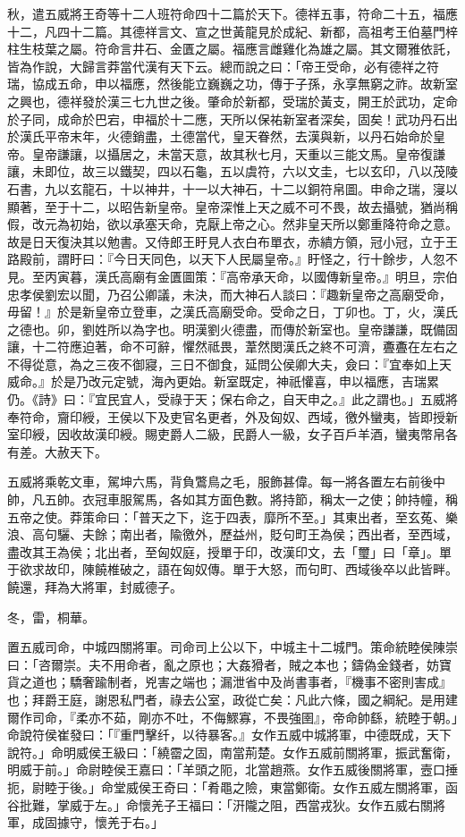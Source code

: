 \begin{pinyinscope}
秋，遣五威將王奇等十二人班符命四十二篇於天下。德祥五事，符命二十五，福應十二，凡四十二篇。其德祥言文、宣之世黃龍見於成紀、新都，高祖考王伯墓門梓柱生枝葉之屬。符命言井石、金匱之屬。福應言雌雞化為雄之屬。其文爾雅依託，皆為作說，大歸言莽當代漢有天下云。總而說之曰：「帝王受命，必有德祥之符瑞，協成五命，申以福應，然後能立巍巍之功，傳于子孫，永享無窮之祚。故新室之興也，德祥發於漢三七九世之後。肇命於新都，受瑞於黃支，開王於武功，定命於子同，成命於巴宕，申福於十二應，天所以保祐新室者深矣，固矣！武功丹石出於漢氏平帝末年，火德銷盡，土德當代，皇天眷然，去漢與新，以丹石始命於皇帝。皇帝謙讓，以攝居之，未當天意，故其秋七月，天重以三能文馬。皇帝復謙讓，未即位，故三以鐵契，四以石龜，五以虞符，六以文圭，七以玄印，八以茂陵石書，九以玄龍石，十以神井，十一以大神石，十二以銅符帛圖。申命之瑞，寖以顯著，至于十二，以昭告新皇帝。皇帝深惟上天之威不可不畏，故去攝號，猶尚稱假，改元為初始，欲以承塞天命，克厭上帝之心。然非皇天所以鄭重降符命之意。故是日天復決其以勉書。又侍郎王盱見人衣白布單衣，赤繢方領，冠小冠，立于王路殿前，謂盱曰：『今日天同色，以天下人民屬皇帝。』盱怪之，行十餘步，人忽不見。至丙寅暮，漢氏高廟有金匱圖策：『高帝承天命，以國傳新皇帝。』明旦，宗伯忠孝侯劉宏以聞，乃召公卿議，未決，而大神石人談曰：『趣新皇帝之高廟受命，毋留！』於是新皇帝立登車，之漢氏高廟受命。受命之日，丁卯也。丁，火，漢氏之德也。卯，劉姓所以為字也。明漢劉火德盡，而傳於新室也。皇帝謙謙，既備固讓，十二符應迫著，命不可辭，懼然祗畏，葦然閔漢氏之終不可濟，斖斖在左右之不得從意，為之三夜不御寢，三日不御食，延問公侯卿大夫，僉曰：『宜奉如上天威命。』於是乃改元定號，海內更始。新室既定，神祇懽喜，申以福應，吉瑞累仍。《詩》曰：『宜民宜人，受祿于天；保右命之，自天申之。』此之謂也。」五威將奉符命，齎印綬，王侯以下及吏官名更者，外及匈奴、西域，徼外蠻夷，皆即授新室印綬，因收故漢印綬。賜吏爵人二級，民爵人一級，女子百戶羊酒，蠻夷幣帛各有差。大赦天下。

五威將乘乾文車，駕坤六馬，背負鷩鳥之毛，服飾甚偉。每一將各置左右前後中帥，凡五帥。衣冠車服駕馬，各如其方面色數。將持節，稱太一之使；帥持幢，稱五帝之使。莽策命曰：「普天之下，迄于四表，靡所不至。」其東出者，至玄菟、樂浪、高句驪、夫餘；南出者，隃徼外，歷益州，貶句町王為侯；西出者，至西域，盡改其王為侯；北出者，至匈奴庭，授單于印，改漢印文，去「璽」曰「章」。單于欲求故印，陳饒椎破之，語在匈奴傳。單于大怒，而句町、西域後卒以此皆畔。饒還，拜為大將軍，封威德子。

冬，雷，桐華。

置五威司命，中城四關將軍。司命司上公以下，中城主十二城門。策命統睦侯陳崇曰：「咨爾崇。夫不用命者，亂之原也；大姦猾者，賊之本也；鑄偽金錢者，妨寶貨之道也；驕奢踰制者，兇害之端也；漏泄省中及尚書事者，『機事不密則害成』也；拜爵王庭，謝恩私門者，祿去公室，政從亡矣：凡此六條，國之綱紀。是用建爾作司命，『柔亦不茹，剛亦不吐，不侮鰥寡，不畏強圉』，帝命帥繇，統睦于朝。」命說符侯崔發曰：「『重門擊纤，以待暴客。』女作五威中城將軍，中德既成，天下說符。」命明威侯王級曰：「繞霤之固，南當荊楚。女作五威前關將軍，振武奮衛，明威于前。」命尉睦侯王嘉曰：「羊頭之阨，北當趙燕。女作五威後關將軍，壼口捶扼，尉睦于後。」命堂威侯王奇曰：「肴黽之險，東當鄭衛。女作五威左關將軍，函谷批難，掌威于左。」命懷羌子王福曰：「汧隴之阻，西當戎狄。女作五威右關將軍，成固據守，懷羌于右。」


\end{pinyinscope}
